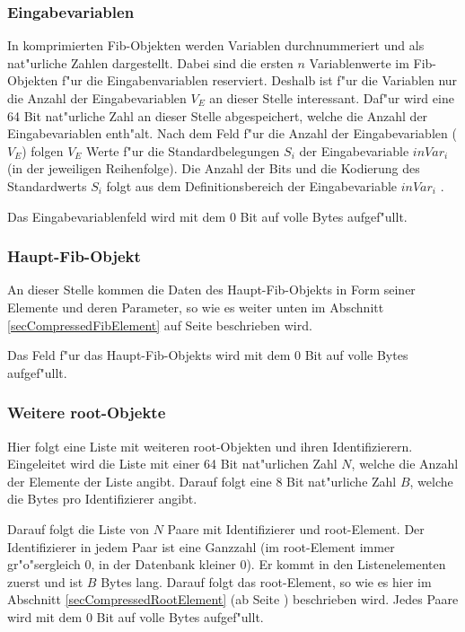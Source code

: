 \subsubsection{Eingabevariablen}
\label{secCompressedRootInputVar}

In komprimierten Fib-Objekten werden Variablen durchnummeriert und als nat"urliche Zahlen dargestellt. Dabei sind die ersten $n$ Variablenwerte im Fib-Objekten f"ur die Eingabenvariablen reserviert. Deshalb ist f"ur die Variablen nur die Anzahl der Eingabevariablen $V_E$ an dieser Stelle interessant. Daf"ur wird eine 64 Bit nat"urliche Zahl an dieser Stelle abgespeichert, welche die Anzahl der Eingabevariablen enth"alt.
Nach dem Feld f"ur die Anzahl der Eingabevariablen ($V_E$) folgen $V_E$ Werte f"ur die Standardbelegungen $S_i$ der Eingabevariable $inVar_i$ (in der jeweiligen Reihenfolge). Die Anzahl der Bits und die Kodierung des Standardwerts $S_i$ folgt aus dem Definitionsbereich der Eingabevariable $inVar_i$ .

Das Eingabevariablenfeld wird mit dem 0 Bit auf volle Bytes aufgef"ullt.


\subsubsection{Haupt-Fib-Objekt}
\label{secCompressedRootMainObject}

An dieser Stelle kommen die Daten des Haupt-Fib-Objekts in Form seiner Elemente und deren Parameter, so wie es weiter unten im Abschnitt \ref{secCompressedFibElement} auf Seite \pageref{secCompressedFibElement} beschrieben wird.

Das Feld f"ur das Haupt-Fib-Objekts wird mit dem 0 Bit auf volle Bytes aufgef"ullt.


\subsubsection{Weitere root-Objekte}
\label{secCompressedRootSubRoot}

Hier folgt eine Liste mit weiteren root-Objekten und ihren Identifizierern. Eingeleitet wird die Liste mit einer 64 Bit nat"urlichen Zahl $N$, welche die Anzahl der Elemente der Liste angibt. Darauf folgt eine 8 Bit nat"urliche Zahl $B$, welche die Bytes pro Identifizierer angibt.

Darauf folgt die Liste von $N$ Paare mit Identifizierer und root-Element. Der Identifizierer in jedem Paar ist eine Ganzzahl (im root-Element immer gr"o"sergleich 0, in der Datenbank kleiner 0). Er kommt in den Listenelementen zuerst und ist $B$ Bytes lang. Darauf folgt das root-Element, so wie es hier im Abschnitt \ref{secCompressedRootElement} (ab Seite \pageref{secCompressedRootElement}) beschrieben wird. Jedes Paare wird mit dem 0 Bit auf volle Bytes aufgef"ullt.



